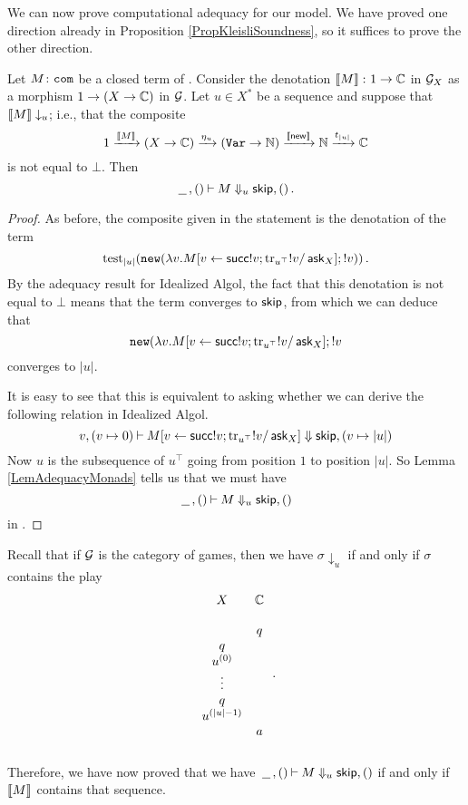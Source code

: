 We can now prove computational adequacy for our model.
We have proved one direction already in Proposition \ref{PropKleisliSoundness}, so it suffices to prove the other direction.

\begin{proposition}
  Let $M\colon {\mathtt{com}}$ be a closed term of \IAX.  
  Consider the denotation $\left\llbracket M\right\rrbracket\colon 1 \to \mathbb{C}$ in $\mathcal G_X$ as a morphism $1 \to (X \to \mathbb{C})$ in $\mathcal G$.  
  Let $u\in X^*$ be a sequence and suppose that $\left\llbracket M\right\rrbracket \downarrow_u$; i.e., that the composite
  \[
    1 \xrightarrow{\left\llbracket M\right\rrbracket}
    (X \to \mathbb{C}) \xrightarrow{\eta_u}
    ({\mathtt{Var}} \to \mathbb{N}) \xrightarrow{\left\llbracket\operatorname{{\mathsf{new}}}\right\rrbracket}
    \mathbb{N} \xrightarrow{t_{|u|}}
    \mathbb{C}
    \]
  is not equal to $\bot$.  
  Then
  \[
    \,\underline{\hspace{1.5ex}}\,,()\mathbin{\vdash} M\Downarrow_u {\mathsf{skip}},()\,.
    \]
  \label{PropKleisliAdequacy}
\end{proposition}
\begin{proof}
  As before, the composite given in the statement is the denotation of the term
  \[
    \operatorname{test}_{|u|} ({\mathtt{new}} (\lambda v.M[v\gets \operatorname{{\mathsf{succ}}} !v;\operatorname{tr}_{u^\top} !v/\operatorname{{\mathsf{ask}}}_X];!v))\,.
    \]
  By the adequacy result for Idealized Algol, the fact that this denotation is not equal to $\bot$ means that the term converges to ${\mathsf{skip}}$, from which we can deduce that
  \[
    {\mathtt{new}} (\lambda v.M[v\gets \operatorname{{\mathsf{succ}}} !v;\operatorname{tr}_{u^\top} !v/\operatorname{{\mathsf{ask}}}_X];!v
    \]
  converges to $|u|$.

  It is easy to see that this is equivalent to asking whether we can derive the following relation in Idealized Algol.
  \[
    v,(v\mapsto 0) \mathbin{\vdash} M[v\gets \operatorname{{\mathsf{succ}}} !v;\operatorname{tr}_{u^\top} !v/\operatorname{{\mathsf{ask}}}_X] \Downarrow {\mathsf{skip}},(v\mapsto |u|)
    \]
  Now $u$ is the subsequence of $u^\top$ going from position $1$ to position $|u|$.  
  So Lemma \ref{LemAdequacyMonads} tells us that we must have
  \[
    \,\underline{\hspace{1.5ex}}\,,()\mathbin{\vdash} M \Downarrow_u {\mathsf{skip}},()
    \]
  in \IAX.
\end{proof}

\begin{remark}
  Recall that if $\mathcal G$ is the category of games, then we have $\sigma\downarrow_u$ if and only if $\sigma$ contains the play 
  \[
    \begin{array}{cc}
      X         & \mathbb{C} \\
                &     \\
                &  q  \\
      q         &     \\
      u^{(0)}   &     \\
      \vdots    &     \\
      q         &     \\
      u^{(|u|-1)}&     \\
                &  a  \\
                &     \\
    \end{array}\,.
    \]
  Therefore, we have now proved that we have $\,\underline{\hspace{1.5ex}}\,,() \mathbin{\vdash} M \Downarrow_u {\mathsf{skip}},()$ if and only if $\left\llbracket M\right\rrbracket$ contains that sequence.
\end{remark}

